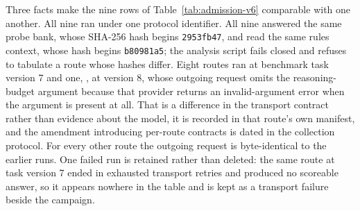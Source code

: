 \documentclass[sigconf,anonymous]{aamas}
\begin{document}
Three facts make the nine rows of Table~\ref{tab:admission-v6} comparable with
one another. All nine ran under one protocol identifier. All nine answered the
same probe bank, whose SHA-256 hash begins \texttt{2953fb47}, and read the same
rules context, whose hash begins \texttt{b80981a5}; the analysis script fails
closed and refuses to tabulate a route whose hashes differ. Eight routes ran at
benchmark task version 7 and one, , at
version 8, whose outgoing request omits the reasoning-budget argument because
that provider returns an invalid-argument error when the argument is present at
all. That is a difference in the transport contract rather than evidence about
the model, it is recorded in that route's own manifest, and the amendment
introducing per-route contracts is dated in the collection protocol. For every
other route the outgoing request is byte-identical to the earlier runs. One
failed run is retained rather than deleted: the same route at task version 7
ended in exhausted transport retries and produced no scoreable answer, so it
appears nowhere in the table and is kept as a transport failure beside the
campaign.
\end{document}
